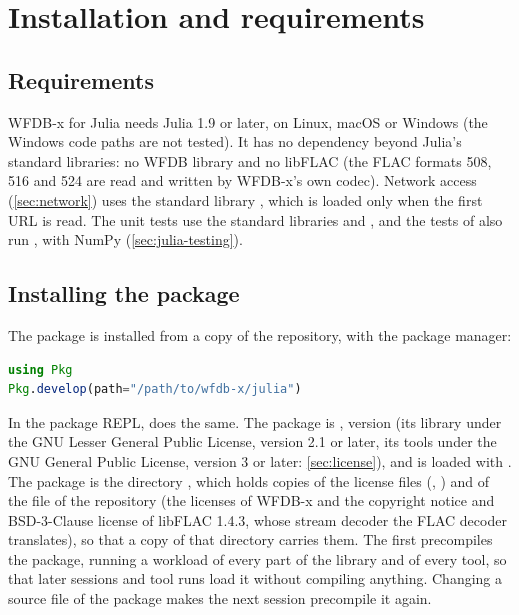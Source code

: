 \section{Installation and requirements}
\label{sec:julia-install}

\subsection{Requirements}

WFDB-x for Julia needs Julia 1.9 or later, on Linux, macOS or Windows (the Windows code
paths are not tested). It has no dependency beyond Julia's standard libraries: no WFDB
library and no libFLAC (the FLAC formats 508, 516 and 524 are read and written by
WFDB-x's own codec). Network access (\cref{sec:network}) uses the standard library
, which is loaded only when the first URL is read. The unit tests use the
standard libraries  and , and the tests of 
also run , with NumPy (\cref{sec:julia-testing}).

\subsection{Installing the package}

The package is installed from a copy of the repository, with the package manager:

\begin{lstlisting}[language=Julia]
using Pkg
Pkg.develop(path="/path/to/wfdb-x/julia")
\end{lstlisting}

In the package REPL, \code{] dev /path/to/wfdb-x/julia} does the same. The package is
, version  (its library under the GNU Lesser General Public
License, version 2.1 or later, its tools under the GNU General Public License, version
3 or later: \cref{sec:license}), and is loaded with . The package is
the directory , which holds copies of the license files (,
) and of the file  of the repository (the licenses of
WFDB-x and the copyright notice and BSD-3-Clause license of libFLAC 1.4.3, whose stream
decoder the FLAC decoder translates), so that a copy of that directory carries them. The
first  precompiles the package,
running a workload of every part of the library and of every tool, so that
later sessions and tool runs load it without compiling anything. Changing a source file
of the package makes the next session precompile it again.

